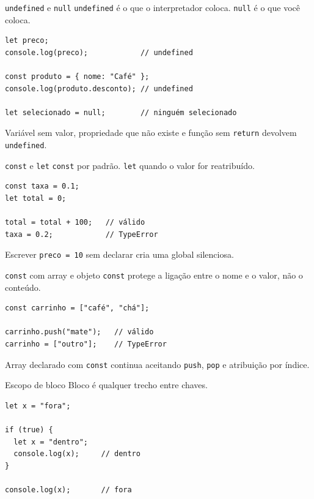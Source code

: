 \documentclass{beamer}
\begin{document}
\begin{frame}[fragile]{\texttt{undefined} e \texttt{null}}
	\texttt{undefined} é o que o interpretador coloca. \texttt{null} é o que você
	coloca.

	\begin{verbatim}
let preco;
console.log(preco);            // undefined

const produto = { nome: "Café" };
console.log(produto.desconto); // undefined

let selecionado = null;        // ninguém selecionado
	\end{verbatim}

	\vspace{0.2cm}
	Variável sem valor, propriedade que não existe e função sem \texttt{return}
	devolvem \texttt{undefined}.
\end{frame}

\begin{frame}[fragile]{\texttt{const} e \texttt{let}}
	\texttt{const} por padrão. \texttt{let} quando o valor for reatribuído.

	\begin{verbatim}
const taxa = 0.1;
let total = 0;

total = total + 100;   // válido
taxa = 0.2;            // TypeError
	\end{verbatim}

	\vspace{0.3cm}
	Escrever \texttt{preco = 10} sem declarar cria uma global silenciosa.
\end{frame}

\begin{frame}[fragile]{\texttt{const} com array e objeto}
	\texttt{const} protege a ligação entre o nome e o valor, não o conteúdo.

	\begin{verbatim}
const carrinho = ["café", "chá"];

carrinho.push("mate");   // válido
carrinho = ["outro"];    // TypeError
	\end{verbatim}

	\vspace{0.3cm}
	Array declarado com \texttt{const} continua aceitando \texttt{push},
	\texttt{pop} e atribuição por índice.
\end{frame}

\begin{frame}[fragile]{Escopo de bloco}
	Bloco é qualquer trecho entre chaves.

	\begin{verbatim}
let x = "fora";

if (true) {
  let x = "dentro";
  console.log(x);     // dentro
}

console.log(x);       // fora
	\end{verbatim}
\end{frame}
\end{document}
